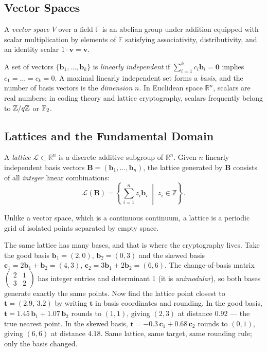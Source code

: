 \subsection{Vector Spaces}
\label{ch41:vecspaces}

A \emph{vector space} $V$ over a field $\mathbb{F}$ is an abelian group under addition
equipped with scalar multiplication by elements of $\mathbb{F}$ satisfying associativity,
distributivity, and an identity scalar $1 \cdot \mathbf{v} = \mathbf{v}$.

A set of vectors $\{\mathbf{b}_1, \dots, \mathbf{b}_k\}$ is \emph{linearly independent}
if $\sum_{i=1}^k c_i \mathbf{b}_i = \mathbf{0}$ implies $c_1 = \dots = c_k = 0$.
A maximal linearly independent set forms a \emph{basis}, and the number of basis vectors
is the \emph{dimension} $n$. In Euclidean space $\mathbb{R}^n$, scalars are real numbers;
in coding theory and lattice cryptography, scalars frequently belong to $\mathbb{Z}/q\mathbb{Z}$ or $\mathbb{F}_2$.

\subsection{Lattices and the Fundamental Domain}
\label{ch41:lattice-def}

A \emph{lattice} $\mathcal{L} \subset \mathbb{R}^n$ is a discrete additive subgroup of
$\mathbb{R}^n$. Given $n$ linearly independent basis vectors $\mathbf{B} = (\mathbf{b}_1, \dots, \mathbf{b}_n)$,
the lattice generated by $\mathbf{B}$ consists of all \emph{integer} linear combinations:
\[
  \mathcal{L}(\mathbf{B}) = \left\{ \sum_{i=1}^n z_i \mathbf{b}_i \;\middle|\; z_i \in \mathbb{Z} \right\}.
\]

Unlike a vector space, which is a continuous continuum, a lattice is a periodic grid of
isolated points separated by empty space.

The same lattice has many bases, and that is where the cryptography lives. Take the
good basis $\mathbf{b}_1 = (2,0)$, $\mathbf{b}_2 = (0,3)$ and the skewed basis
$\mathbf{c}_1 = 2\mathbf{b}_1 + \mathbf{b}_2 = (4,3)$, $\mathbf{c}_2 = 3\mathbf{b}_1 + 2\mathbf{b}_2 = (6,6)$.
The change-of-basis matrix $\left(\begin{smallmatrix}2&1\\3&2\end{smallmatrix}\right)$ has integer entries and
determinant $1$ (it is \emph{unimodular}), so both bases generate exactly the same points.
Now find the lattice point closest to $\mathbf{t} = (2.9,\, 3.2)$ by writing $\mathbf{t}$ in basis
coordinates and rounding. In the good basis, $\mathbf{t} = 1.45\,\mathbf{b}_1 + 1.07\,\mathbf{b}_2$
rounds to $(1,1)$, giving $(2,3)$ at distance $0.92$ --- the true nearest point. In the skewed basis,
$\mathbf{t} = -0.3\,\mathbf{c}_1 + 0.68\,\mathbf{c}_2$ rounds to $(0,1)$, giving $(6,6)$ at distance
$4.18$. Same lattice, same target, same rounding rule; only the basis changed.

